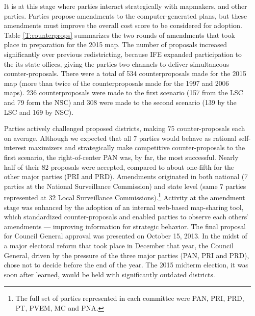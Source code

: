 \documentclass[letter,12pt]{article}
\begin{document}
It is at this stage where parties interact strategically with mapmakers, and other parties. Parties propose amendments to the computer-generated plans, but these amendments must improve the overall cost score to be considered for adoption. Table \ref{T:counterprops} summarizes the two rounds of amendments that took place in preparation for the 2015 map. The number of proposals increased significantly over previous redistricting, because IFE expanded participation to the its state offices, giving the parties two channels to deliver simultaneous counter-proposals. There were a total of 534 counterproposals made for the 2015 map (more than twice of the counterproposals made for the 1997 and 2006 maps). 236 counterproposals were made to the first scenario (157 from the LSC and 79 form the NSC) and 308 were made to the second scenario (139 by the LSC and 169 by NSC).

Parties actively challenged proposed districts, making 75 counter-proposals each on average. Although we expected that all 7 parties would behave as rational self-interest maximizers and strategically make competitive counter-proposals to the first scenario, the right-of-center PAN was, by far, the most successful. Nearly half of their 82 proposals were accepted, compared to about one-fifth for the other major parties (PRI and PRD). Amendments originated in both national (7 parties at the National Surveillance Commission) and state level (same 7 parties represented at 32 Local Surveillance Commissions).\footnote{The full set of parties represented in each committee were PAN, PRI, PRD, PT, PVEM, MC and PNA.} Activity at the amendment stage was enhanced by the adoption of an internal web-based map-sharing tool, which standardized counter-proposals and enabled parties to observe each others' amendments --- improving information for strategic behavior. The final proposal for Council General approval was presented on October 15, 2013. In the midst of a major electoral reform that took place in December that year, the Council General, driven by the pressure of the three major parties (PAN, PRI and PRD), chose not to decide before the end of the year. The 2015 midterm election, it was soon after learned, would be held with significantly outdated districts. 
\end{document}
